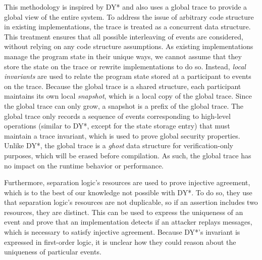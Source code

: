 This methodology is inspired by DY* and also uses a global trace to provide a global view of the entire system.
To address the issue of arbitrary code structure in existing implementations, the trace is treated as a concurrent data structure.
This treatment ensures that all possible interleaving of events are considered, without relying on any code structure assumptions.
As existing implementations manage the program state in their unique ways, we cannot assume that they store the state on the trace or rewrite implementations to do so. Instead, \emph{local invariants} are used to relate the program state stored at a participant to events on the trace.
Because the global trace is a shared structure, each participant maintains its own local \emph{snapshot}, which is a local copy of the global trace. Since the global trace can only grow, a snapshot is a prefix of the global trace. 
The global trace only records a sequence of events corresponding to high-level operations (similar to DY*, except for the state storage entry) that must maintain a trace invariant, which is used to prove global security properties.
Unlike DY*, the global trace is a \emph{ghost} data structure for verification-only purposes, which will be erased before compilation. As such, the global trace has no impact on the runtime behavior or performance.

Furthermore, separation logic's resources are used to prove injective agreement, which is to the best of our knowledge not possible with DY*.
To do so, they use that separation logic's resources are not duplicable, so if an assertion includes two resources, they are distinct.
This can be used to express the uniqueness of an event and prove that an implementation detects if an attacker replays messages, which is necessary to satisfy injective agreement.
Because DY*'s invariant is expressed in first-order logic, it is unclear how they could reason about the uniqueness of particular events.


